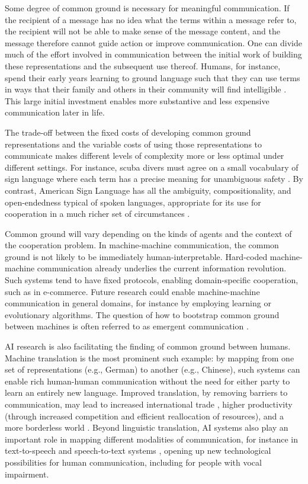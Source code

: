 \documentclass[11pt, a4paper, logo, onecolumn, nonumbering]{deepmind}
\begin{document}
Some degree of common ground is necessary for meaningful communication. If the recipient of a message has no idea what the terms within a message refer to, the recipient will not be able to make sense of the message content, and the message therefore cannot guide action or improve communication. One can divide much of the effort involved in communication between the initial work of building these representations and the subsequent use thereof. Humans, for instance, spend their early years learning to ground language such that they can use terms in ways that their family and others in their community will find intelligible \cite{tomasello2013, bohn2017}. This large initial investment enables more substantive and less expensive communication later in life.

The trade-off between the fixed costs of developing common ground representations and the variable costs of using those representations to communicate makes different levels of complexity more or less optimal under different settings. For instance, scuba divers must agree on a small vocabulary of sign language where each term has a precise meaning for unambiguous safety \cite{doi:10.1177/1468797611432040}. By contrast, American Sign Language has all the ambiguity, compositionality, and open-endedness typical of spoken languages, appropriate for its use for cooperation in a much richer set of circumstances \cite{goldin2017gesture}.

Common ground will vary depending on the kinds of agents and the context of the cooperation problem.  In machine-machine communication, the common ground is not likely to be immediately human-interpretable. Hard-coded machine-machine communication \cite{AMODU2018255} already underlies the current information revolution. Such systems tend to have fixed protocols, enabling domain-specific cooperation, such as in e-commerce. Future research could enable machine-machine communication in general domains, for instance by employing learning or evolutionary algorithms. The question of how to bootstrap common ground between machines is often referred to as emergent communication \cite{wagner2003progress, sukhbaatar2016learning, foerster2016learning, DBLP:journals/corr/abs-1804-03980}. 

AI research is also facilitating the finding of common ground between humans. Machine translation is the most prominent such example: by mapping from one set of representations (e.g., German) to another (e.g., Chinese), such systems can enable rich human-human communication without the need for either party to learn an entirely new language. Improved translation, by removing barriers to communication, may lead to increased international trade \cite{brynjolfsson2019does}, higher productivity (through increased competition and efficient reallocation of resources), and a more borderless world \cite{weber20202020s}. Beyond linguistic translation, AI systems also play an important role in mapping different modalities of communication, for instance in text-to-speech \cite{ning2019review, klatt1987review} and speech-to-text systems \cite{shadiev2014review, nassif2019speech}, opening up new technological possibilities for human communication, including for people with vocal impairment.   
\end{document}
